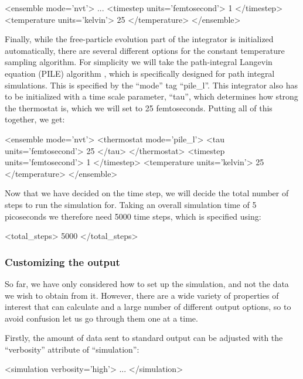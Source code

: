 \documentclass[11pt,english,fleqn]{report}
\newenvironment{code}{%
\footnotesize 
\verbatim
}{
\endverbatim
\normalsize
}
\begin{document}
\begin{code}
<ensemble mode='nvt'>
   ...
   <timestep units='femtosecond'> 1 </timestep>
   <temperature units='kelvin'> 25 </temperature>
</ensemble>
\end{code}

Finally, while the free-particle evolution part of the integrator
is initialized automatically, there are several different options
for the constant temperature sampling algorithm. For simplicity we
will take the path-integral Langevin equation (PILE) algorithm \cite{ceri+10jcp},
which is specifically designed for path integral simulations. 
This is specified by the {}``mode'' tag {}``pile\_l''. 
This integrator also has to
be initialized with a time scale parameter, {}``tau'', which determines
how strong the thermostat is, which we will set to 25 femtoseconds. 
Putting all of this together, we get:

\begin{code}
<ensemble mode='nvt'>
   <thermostat mode='pile_l'>
      <tau units='femtosecond'> 25 </tau>
   </thermostat>
   <timestep units='femtosecond'> 1 </timestep>
   <temperature units='kelvin'> 25 </temperature>
</ensemble>
\end{code}

Now that we have decided on the time step, we will decide the total
number of steps to run the simulation for. Taking an overall 
simulation time of 5 picoseconds we therefore need 5000 time steps, 
which is specified using:

\begin{code}
<total\_steps> 5000 </total\_steps>
\end{code}

\subsubsection{Customizing the output}

So far, we have only considered how to set up the simulation, and not
the data we wish to obtain from it. However, there are a wide
variety of properties of interest that \ipi can calculate 
and a large number of different output
options, so to avoid confusion let us go through them one at a time.

Firstly, the amount of data sent to standard output can be adjusted
with the {}``verbosity'' attribute of {}``simulation'':

\begin{code}
<simulation verbosity='high'>
   ...
</simulation>
\end{code}
\end{document}
